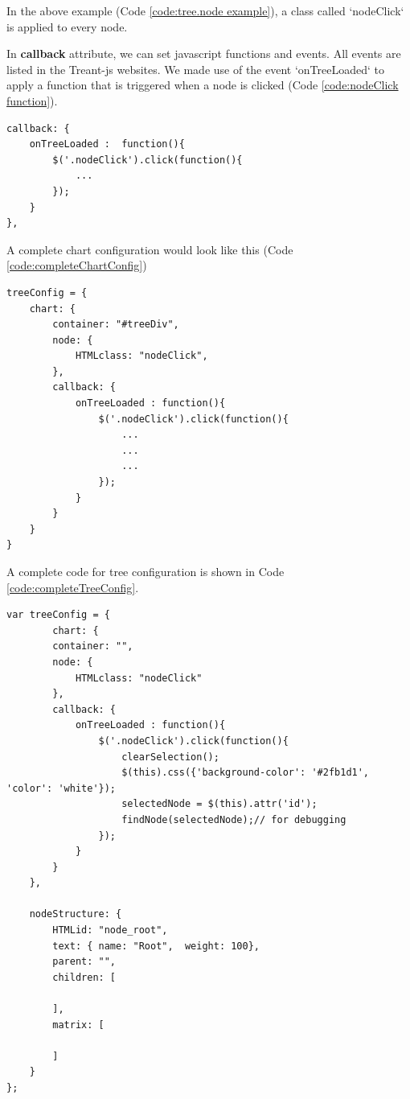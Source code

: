 \documentclass[11pt]{article} %
\begin{document}
\noindent In the above example (Code \ref{code:tree.node example}), a class called `nodeClick` is applied to every node.

\noindent In \textbf{callback} attribute, we can set javascript functions and events. All events are listed in the Treant-js websites. We made use of the event `onTreeLoaded` to apply a function that is triggered when a node is clicked (Code \ref{code:nodeClick function}).
\\[12pt]
\noindent
\begin{minipage}[c]{\linewidth}
\begin{lstlisting}[basicstyle=\scriptsize, tabsize=4, frame=single, caption=Node click trigger function, label=code:nodeClick function]
callback: {
	onTreeLoaded :  function(){
		$('.nodeClick').click(function(){
			...
		});
	}
},
\end{lstlisting}
\end{minipage}


\noindent A complete chart configuration would look like this (Code \ref{code:completeChartConfig})

\noindent
\begin{minipage}[c]{\linewidth}
\begin{lstlisting}[basicstyle=\scriptsize, tabsize=4, frame=single, caption= Chart configuration, label=code:completeChartConfig]
treeConfig = {
	chart: {
		container: "#treeDiv",
		node: {
			HTMLclass: "nodeClick",
		},
		callback: {
			onTreeLoaded : function(){
				$('.nodeClick').click(function(){
					...
					...
					...
				});
			}
		}
	}
}
\end{lstlisting}
\end{minipage}

A complete code for tree configuration is shown in Code \ref{code:completeTreeConfig}.

\noindent
\begin{minipage}[c]{\linewidth}
\begin{lstlisting}[basicstyle=\scriptsize, tabsize=4, frame=single, caption= Complete Tree Configuration, label=code:completeTreeConfig]
var treeConfig = {
	    chart: {
        container: "",
		node: {
			HTMLclass: "nodeClick"
		},
		callback: {
			onTreeLoaded : function(){
				$('.nodeClick').click(function(){
					clearSelection();
					$(this).css({'background-color': '#2fb1d1', 'color': 'white'});
					selectedNode = $(this).attr('id');
					findNode(selectedNode);// for debugging
				});
			}
		}
    },
    
    nodeStructure: {
		HTMLid: "node_root",
        text: { name: "Root",  weight: 100},
		parent: "",
        children: [
			
		],
		matrix: [
		
		]
    }
};

\end{lstlisting}
\end{minipage}
\end{document}
